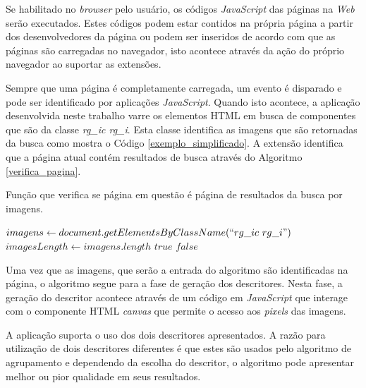 Se habilitado no \emph{browser} pelo usuário, os códigos \emph{JavaScript} das páginas na \emph{Web} serão executados. Estes códigos podem estar contidos na própria página a partir dos desenvolvedores da página ou podem ser inseridos de acordo com que as páginas são carregadas no navegador, isto acontece através da ação do próprio navegador ao suportar as extensões.

Sempre que uma página é completamente carregada, um evento é disparado e pode ser identificado por aplicações \emph{JavaScript}. Quando isto acontece, a aplicação desenvolvida neste trabalho varre os elementos HTML em busca de componentes que são da classe \emph{rg\_ic rg\_i}. Esta classe identifica as imagens que são retornadas da busca como mostra o Código \ref{exemplo_simplificado}. A extensão identifica que a página atual contém resultados de busca através do Algoritmo \ref{verifica_pagina}.
\begin{algorithm}[htb]
\caption{Função que verifica se página em questão é página de resultados da busca por imagens.}
\label{verifica_pagina}
	\begin{algorithmic}[1]
		\State $imagens \gets document.getElementsByClassName(``rg\_ic\ rg\_i")$
		\State $imagesLength \gets imagens.length$
			\State \Return $true$
		\Else
			\State \Return $false$
		\EndIf
	\EndFunction
	\end{algorithmic}
\end{algorithm}

Uma vez que as imagens, que serão a entrada do algoritmo são identificadas na página, o algoritmo segue para a fase de geração dos descritores. Nesta fase, a geração do descritor acontece através de um código em \emph{JavaScript} que interage com o componente HTML \emph{canvas} que permite o acesso aos \emph{pixels} das imagens. 

A aplicação suporta o uso dos dois descritores apresentados. A razão para utilização de dois descritores diferentes é que estes são usados pelo algoritmo de agrupamento e dependendo da escolha do descritor, o algoritmo pode apresentar melhor ou pior qualidade em seus resultados.

